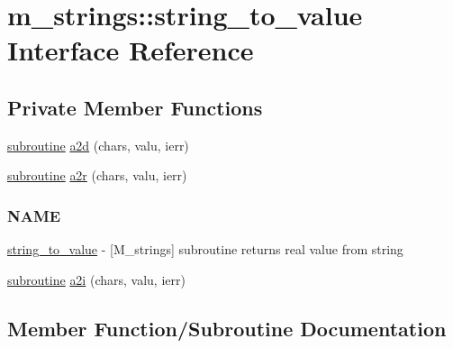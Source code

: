 \hypertarget{interfacem__strings_1_1string__to__value}{}\section{m\+\_\+strings\+:\+:string\+\_\+to\+\_\+value Interface Reference}
\label{interfacem__strings_1_1string__to__value}
\subsection*{Private Member Functions}
\begin{DoxyCompactItemize}
\item 
\hyperlink{M__stopwatch_83_8txt_acfbcff50169d691ff02d4a123ed70482}{subroutine} \hyperlink{interfacem__strings_1_1string__to__value_a7e6fa828946adab0e79403dbf03a24d1}{a2d} (chars, valu, ierr)
\item 
\hyperlink{M__stopwatch_83_8txt_acfbcff50169d691ff02d4a123ed70482}{subroutine} \hyperlink{interfacem__strings_1_1string__to__value_aec779c978fa7bcc812c6cb029321b5f0}{a2r} (chars, valu, ierr)
\begin{DoxyCompactList}\small\item\em \subsubsection*{N\+A\+ME}

\hyperlink{interfacem__strings_1_1string__to__value}{string\+\_\+to\+\_\+value} -\/ \mbox{[}M\+\_\+strings\mbox{]} subroutine returns real value from string \end{DoxyCompactList}\item 
\hyperlink{M__stopwatch_83_8txt_acfbcff50169d691ff02d4a123ed70482}{subroutine} \hyperlink{interfacem__strings_1_1string__to__value_a2089572a0b06d524be83d9089589c959}{a2i} (chars, valu, ierr)
\end{DoxyCompactItemize}


\subsection{Member Function/\+Subroutine Documentation}
\mbox{\label{interfacem__strings_1_1string__to__value_a7e6fa828946adab0e79403dbf03a24d1}} 
